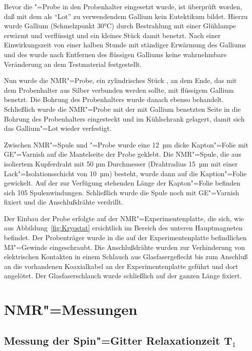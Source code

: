 Bevor die \aug"=Probe in den Probenhalter eingesetzt wurde, ist überprüft worden, daß \aug{} mit
dem als "`Lot"' zu verwendendem Gallium kein Eutektikum bildet. Hierzu wurde Gallium (Schmelzpunkt
30°C) durch Bestrahlung mit einer Glühlampe erwärmt und verflüssigt und ein kleines Stück \aug{}
damit benetzt. Nach einer Einwirkungszeit von einer halben Stunde mit ständiger Erwärmung des
Galliums und des \aug{} wurde nach Entfernen des flüssigen Galliums keine wahrnehmbare Veränderung
an dem \aug{} Testmaterial festgestellt.

Nun wurde die NMR"=Probe, ein zylindrisches Stück \aug{}, an dem Ende, das mit dem Probenhalter aus
Silber verbunden werden sollte, mit flüssigem Gallium benetzt. Die Bohrung des Probenhalters wurde
danach ebenso behandelt. Schließlich wurde die NMR"=Probe mit der mit
Gallium benetzten Seite in die Bohrung des Probenhalters eingesteckt und im Kühlschrank gelagert,
damit sich das Gallium"=Lot wieder verfestigt.

Zwischen NMR"=Spule und \aug"=Probe wurde eine 12~$µ$m dicke Kapton"=Folie mit GE"=Varnish
auf die Mantelseite der Probe geklebt. Die NMR"=Spule, die aus isoliertem Kupferdraht mit 50 $µ$m
Durchmesser (Drahtradius 15~$µ$m mit einer Lack"=Isolationsschicht von 10~$µ$m) besteht, wurde dann
auf die Kaption"=Folie gewickelt. Auf der zur Verfügung stehenden Länge der Kapton"=Folie befinden
sich 105 Spulenwindungen. Schließlich wurde die Spule noch mit GE"=Varnish fixiert und die
Anschlußdrähte verdrillt.

Der Einbau der Probe erfolgte auf der NMR"=Experimentenplatte, die sich, wie aus
Abbildung~\ref{fig:Kryostat} ersichtlich im Bereich des unteren Hauptmagneten befindet. Der Probenträger wurde
in die auf der Experimentenplatte befindlichen M3"=Gewinde eingeschraubt. Die Anschlußdrähte wurden
zur Verhinderung von elektrischen Kontakten in einem Schlauch aus Glasfasergeflecht bis zum
Anschluß an die vorhandenen Koaxialkabel an der Experimentenplatte geführt und dort angelötet.
Der Glasfaserschlauch wurde schließlich auf der ganzen Länge fixiert.


\section{NMR"=Messungen}

\subsection{Messung der Spin"=Gitter Relaxationzeit T$_1$}

